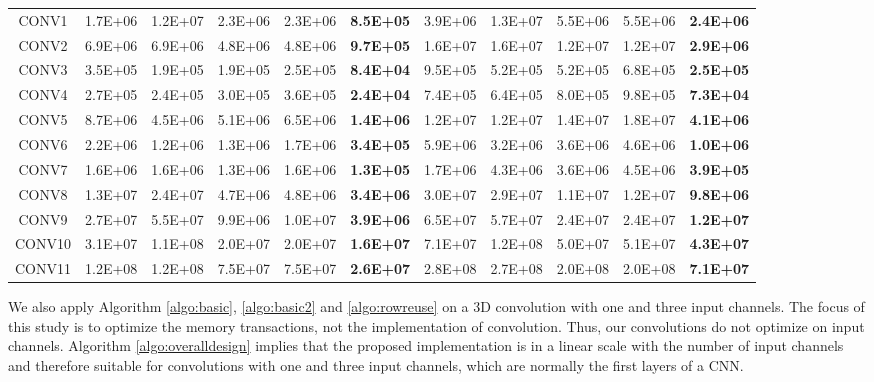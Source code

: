 \begin{table}[]
\begin{tabular}{c|ccccc|ccccc}
CONV1& 1.7E+06& 1.2E+07& 2.3E+06& 2.3E+06& \textbf{8.5E+05}& 3.9E+06& 1.3E+07& 5.5E+06& 5.5E+06& \textbf{2.4E+06}\\
CONV2& 6.9E+06& 6.9E+06& 4.8E+06& 4.8E+06& \textbf{9.7E+05}& 1.6E+07& 1.6E+07& 1.2E+07& 1.2E+07& \textbf{2.9E+06}\\
CONV3& 3.5E+05& 1.9E+05& 1.9E+05& 2.5E+05& \textbf{8.4E+04}& 9.5E+05& 5.2E+05& 5.2E+05& 6.8E+05& \textbf{2.5E+05}\\
CONV4& 2.7E+05& 2.4E+05& 3.0E+05& 3.6E+05& \textbf{2.4E+04}& 7.4E+05& 6.4E+05& 8.0E+05& 9.8E+05& \textbf{7.3E+04}\\
CONV5& 8.7E+06& 4.5E+06& 5.1E+06& 6.5E+06& \textbf{1.4E+06}& 1.2E+07& 1.2E+07& 1.4E+07& 1.8E+07& \textbf{4.1E+06}\\
CONV6& 2.2E+06& 1.2E+06& 1.3E+06& 1.7E+06& \textbf{3.4E+05}& 5.9E+06& 3.2E+06& 3.6E+06& 4.6E+06& \textbf{1.0E+06}\\
CONV7& 1.6E+06& 1.6E+06& 1.3E+06& 1.6E+06& \textbf{1.3E+05}& 1.7E+06& 4.3E+06& 3.6E+06& 4.5E+06& \textbf{3.9E+05}\\
CONV8& 1.3E+07& 2.4E+07& 4.7E+06& 4.8E+06& \textbf{3.4E+06}& 3.0E+07& 2.9E+07& 1.1E+07& 1.2E+07& \textbf{9.8E+06}\\
CONV9& 2.7E+07& 5.5E+07& 9.9E+06& 1.0E+07& \textbf{3.9E+06}& 6.5E+07& 5.7E+07& 2.4E+07& 2.4E+07& \textbf{1.2E+07}\\
CONV10& 3.1E+07& 1.1E+08& 2.0E+07& 2.0E+07& \textbf{1.6E+07}& 7.1E+07& 1.2E+08& 5.0E+07& 5.1E+07& \textbf{4.3E+07}\\
CONV11& 1.2E+08& 1.2E+08& 7.5E+07& 7.5E+07& \textbf{2.6E+07}& 2.8E+08& 2.7E+08& 2.0E+08& 2.0E+08& \textbf{7.1E+07}\\ \hline
\end{tabular}
\end{table}

We also apply Algorithm \ref{algo:basic}, \ref{algo:basic2} and \ref{algo:rowreuse} on a 3D convolution with one and three input channels. The focus of this study is to optimize the memory transactions, not the implementation of convolution. Thus, our convolutions do not optimize on
input channels. Algorithm \ref{algo:overalldesign} implies that the proposed implementation is in a linear scale with the number of input channels and therefore suitable for convolutions with one and three input channels, which are normally the first layers of a CNN.

